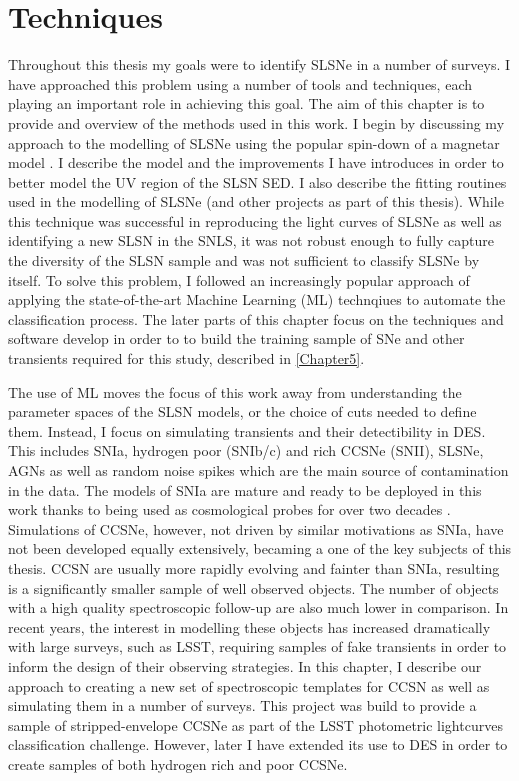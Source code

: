 \chapter{Techniques}
\label{Chapter4}

Throughout this thesis my goals were to identify SLSNe in a number of surveys. I have approached this problem using a number of tools and techniques, each playing an important role in achieving this goal. The aim of this chapter is to provide and overview of the methods used in this work. I begin by discussing my approach to the modelling of SLSNe using the popular spin-down of a magnetar model . I describe the model and the improvements I have introduces in order to better model the UV region of the SLSN SED. I also describe the fitting routines used in the modelling of SLSNe (and other projects as part of this thesis). While this technique was successful in reproducing the light curves of SLSNe as well as identifying a new SLSN in the SNLS, it was not robust enough to fully capture the diversity of the SLSN sample and was not sufficient to classify SLSNe by itself. To solve this problem, I followed an increasingly popular approach of applying the state-of-the-art Machine Learning (ML) technqiues to automate the classification process. The later parts of this chapter focus on the techniques and software develop in order to to build the training sample of SNe and other transients required for this study, described in \cref{Chapter5}.

The use of ML moves the focus of this work away from understanding the parameter spaces of the SLSN models, or the choice of cuts needed to define them. Instead, I focus on simulating transients and their detectibility in DES. This includes SNIa, hydrogen poor (SNIb/c) and rich CCSNe (SNII), SLSNe, AGNs as well as random noise spikes which are the main source of contamination in the data. The models of SNIa are mature and ready to be deployed in this work \citep{Kessler2009,Kessler2015} thanks to being used as cosmological probes for over two decades \citep{Riess1998,Perlmutter1999}. Simulations of CCSNe, however, not driven by similar motivations as SNIa, have not been developed equally extensively, becaming a one of the key subjects of this thesis. CCSN are usually more rapidly evolving and fainter than SNIa, resulting is a significantly smaller sample of well observed objects. The number of objects with a high quality spectroscopic follow-up are also much lower in comparison. In recent years, the interest in modelling these objects has increased dramatically with large surveys, such as LSST, requiring samples of fake transients in order to inform the design of their observing strategies. In this chapter, I describe our approach to creating a new set of spectroscopic templates for  CCSN as well as simulating them in a number of surveys. This project was build to provide a sample of stripped-envelope CCSNe as part of the LSST photometric lightcurves classification challenge. However, later I have extended its use to DES in order to create samples of both hydrogen rich and poor CCSNe.

